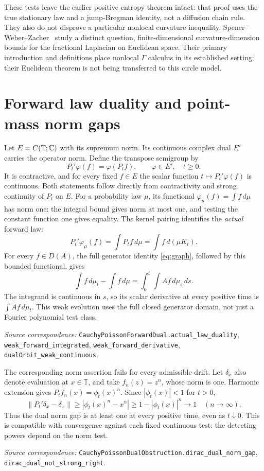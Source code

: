 \documentclass[11pt]{article}
\newcommand{\T}{\mathbb T}\newcommand{\D}{\mathbb D}
\newcommand{\code}[1]{{\small\nolinkurl{#1}}}
\begin{document}
These tests leave the earlier positive entropy theorem intact:
that proof uses the true stationary law and a jump-Bregman identity,
not a diffusion chain rule. They also do not disprove a particular
nonlocal curvature inequality. Spener--Weber--Zacher~\cite{swz}
study a distinct question, finite-dimensional curvature-dimension
bounds for the fractional Laplacian on Euclidean space. Their
primary introduction and definitions place nonlocal $\Gamma$
calculus in its established setting; their Euclidean theorem is
not being transferred to this circle model.

\section{Forward law duality and point-mass norm gaps}
Let $E=C(\T;\C)$ with its supremum norm. Its continuous complex dual
$E'$ carries the operator norm. Define the transpose semigroup by
\[
 P_t'\varphi(f)=\varphi(P_tf),\qquad \varphi\in E',\quad t\geq0.
\]
It is contractive, and for every fixed $f\in E$ the scalar function
$t\mapsto P_t'\varphi(f)$ is continuous. Both statements follow directly
from contractivity and strong continuity of $P_t$ on $E$.
For a probability law $\mu$, its functional
$\varphi_\mu(f)=\int f\,d\mu$ has norm one: the integral bound gives
norm at most one, and testing the constant function one gives equality.
The kernel pairing identifies the \emph{actual} forward law:
\[
 P_t'\varphi_\mu(f)=\int P_tf\,d\mu=\int f\,d(\mu K_t).
\]
For every $f\in D(A)$, the full generator identity
\eqref{eq:graph}, followed by this bounded functional, gives
\begin{equation}\label{eq:dualweakint}
 \int f\,d\mu_t-\int f\,d\mu
      =\int_0^t\int Af\,d\mu_s\,ds.
\end{equation}
The integrand is continuous in $s$, so its scalar derivative at every
positive time is $\int Af\,d\mu_t$. This weak evolution uses the full
closed generator domain, not just a Fourier polynomial test class.
\par\smallskip\begingroup\small\raggedright
\textit{Source correspondence:} \code{CauchyPoissonForwardDual.actual_law_duality},
\code{weak_forward_integrated}, \code{weak_forward_derivative},
\code{dualOrbit_weak_continuous}.
\par\endgroup

The corresponding norm assertion fails for every admissible drift.
Let $\delta_x$ also denote evaluation at $x\in\T$, and take
$f_n(z)=z^n$, whose norm is one. Harmonic extension gives
$P_tf_n(x)=\phi_t(x)^n$. Since $|\phi_t(x)|<1$ for $t>0$,
\[
 \|P_t'\delta_x-\delta_x\|
  \geq|\phi_t(x)^n-x^n|
  \geq1-|\phi_t(x)|^n\longrightarrow1\quad(n\to\infty).
\]
Thus the dual norm gap is at least one at every positive time, even
as $t\downarrow0$. This is compatible with convergence against each
fixed continuous test: the detecting powers depend on the norm test.
\par\smallskip\begingroup\small\raggedright
\textit{Source correspondence:} \code{CauchyPoissonDualObstruction.dirac_dual_norm_gap},
\code{dirac_dual_not_strong_right}.
\par\endgroup
\end{document}
